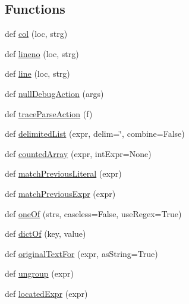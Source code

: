 \subsection*{Functions}
\begin{DoxyCompactItemize}
\item 
def \hyperlink{namespacesetuptools_1_1__vendor_1_1pyparsing_a13f78917dedd3b24efd20f220ea25649}{col} (loc, strg)
\item 
def \hyperlink{namespacesetuptools_1_1__vendor_1_1pyparsing_a31108ad3c6a3d4e149a97111151f0e2e}{lineno} (loc, strg)
\item 
def \hyperlink{namespacesetuptools_1_1__vendor_1_1pyparsing_ad42642ba9455cf9de12294141a2ead3c}{line} (loc, strg)
\item 
def \hyperlink{namespacesetuptools_1_1__vendor_1_1pyparsing_a3a21b9f56d8c5ba75db0a0fdaf32b1d6}{null\+Debug\+Action} (args)
\item 
def \hyperlink{namespacesetuptools_1_1__vendor_1_1pyparsing_af9395a9f6f052897698d7d36db00c167}{trace\+Parse\+Action} (f)
\item 
def \hyperlink{namespacesetuptools_1_1__vendor_1_1pyparsing_a1989367af98a82b6d6b4860de6b9f2f1}{delimited\+List} (expr, delim=\char`\"{},  combine=False)
\item 
def \hyperlink{namespacesetuptools_1_1__vendor_1_1pyparsing_a67bb1324811cd2d127f551efcefa1333}{counted\+Array} (expr, int\+Expr=None)
\item 
def \hyperlink{namespacesetuptools_1_1__vendor_1_1pyparsing_a393741457528cb74c30ae20af30b55e0}{match\+Previous\+Literal} (expr)
\item 
def \hyperlink{namespacesetuptools_1_1__vendor_1_1pyparsing_a324d1040438b9eb557139021a6309777}{match\+Previous\+Expr} (expr)
\item 
def \hyperlink{namespacesetuptools_1_1__vendor_1_1pyparsing_a13b417dc52bf215cec38c76be97ad862}{one\+Of} (strs, caseless=False, use\+Regex=True)
\item 
def \hyperlink{namespacesetuptools_1_1__vendor_1_1pyparsing_aa44c382b31b67ce7b69b0999b4c7ed70}{dict\+Of} (key, value)
\item 
def \hyperlink{namespacesetuptools_1_1__vendor_1_1pyparsing_addf8c0cb0b6a64f194b3c9e8ad564c8b}{original\+Text\+For} (expr, as\+String=True)
\item 
def \hyperlink{namespacesetuptools_1_1__vendor_1_1pyparsing_a4eccbcc70b9c528f34c89347bef1d5c5}{ungroup} (expr)
\item 
def \hyperlink{namespacesetuptools_1_1__vendor_1_1pyparsing_a5bf80e004c259899048cb4b3e80480f8}{located\+Expr} (expr)

\end{DoxyCompactItemize}

